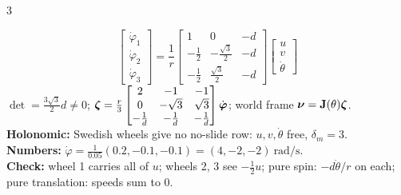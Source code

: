 \begin{multicols}{3}
\begin{examq}
\[\boxed{\begin{bmatrix}\dot\varphi_1\\\dot\varphi_2\\\dot\varphi_3\end{bmatrix}=\frac1r\begin{bmatrix}1&0&-d\\-\frac12&-\frac{\sqrt3}2&-d\\-\frac12&\frac{\sqrt3}2&-d\end{bmatrix}\begin{bmatrix}u\\v\\\dot\theta\end{bmatrix}}\]
$\det=\tfrac{3\sqrt3}2d\ne0$; $\boldsymbol\zeta=\frac r3\begin{bmatrix}2&-1&-1\\0&-\sqrt3&\sqrt3\\-\frac1d&-\frac1d&-\frac1d\end{bmatrix}\dot{\boldsymbol\varphi}$; world frame $\boldsymbol\nu=\mathbf J(\theta)\boldsymbol\zeta$.\\
\textbf{Holonomic:} Swedish wheels give no no-slide row: $u,v,\dot\theta$ free, $\delta_m=3$.\\
\textbf{Numbers:} $\dot\varphi=\frac1{0.05}(0.2,-0.1,-0.1)=\boxed{(4,-2,-2)\ \text{rad/s}}$.\\
\textbf{Check:} wheel 1 carries all of $u$; wheels 2, 3 see $-\frac12u$; pure spin: $-d\dot\theta/r$ on each; pure translation: speeds sum to $0$. \chk
\end{examq}
\end{multicols}
